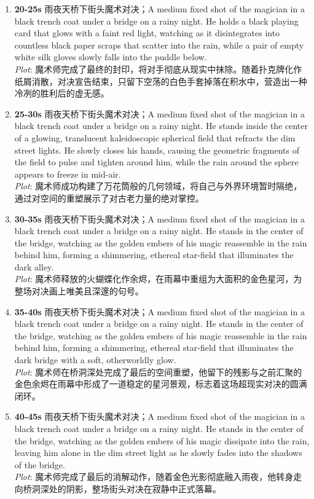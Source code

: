 \documentclass[11pt,a4paper]{article}
\begin{document}
\begin{enumerate}
\item \textbf{20-25s} 雨夜天桥下街头魔术对决；A medium fixed shot of the magician in a black trench coat under a bridge on a rainy night. He holds a black playing card that glows with a faint red light, watching as it disintegrates into countless black paper scraps that scatter into the rain, while a pair of empty white silk gloves slowly falls into the puddle below.\\\newline \textit{Plot}: 魔术师完成了最终的封印，将对手彻底从现实中抹除。随着扑克牌化作纸屑消散，对决宣告结束，只留下空荡的白色手套掉落在积水中，营造出一种冷冽的胜利后的虚无感。
\item \textbf{25-30s} 雨夜天桥下街头魔术对决；A medium fixed shot of the magician in a black trench coat under a bridge on a rainy night. He stands inside the center of a glowing, translucent kaleidoscopic spherical field that refracts the dim street lights. He slowly closes his hands, causing the geometric fragments of the field to pulse and tighten around him, while the rain around the sphere appears to freeze in mid-air.\\\newline \textit{Plot}: 魔术师成功构建了万花筒般的几何领域，将自己与外界环境暂时隔绝，通过对空间的重塑展示了对古老力量的绝对掌控。
\item \textbf{30-35s} 雨夜天桥下街头魔术对决；A medium fixed shot of the magician in a black trench coat under a bridge on a rainy night. He stands in the center of the bridge, watching as the golden embers of his magic reassemble in the rain behind him, forming a shimmering, ethereal star-field that illuminates the dark alley.\\\newline \textit{Plot}: 魔术师释放的火蝴蝶化作余烬，在雨幕中重组为大面积的金色星河，为整场对决画上唯美且深邃的句号。
\item \textbf{35-40s} 雨夜天桥下街头魔术对决；A medium fixed shot of the magician in a black trench coat under a bridge on a rainy night. He stands in the center of the bridge, watching as the golden embers of his magic reassemble in the rain behind him, forming a shimmering, ethereal star-field that illuminates the dark bridge with a soft, otherworldly glow.\\\newline \textit{Plot}: 魔术师在桥洞深处完成了最后的空间重塑，他留下的残影与之前汇聚的金色余烬在雨幕中形成了一道稳定的星河景观，标志着这场超现实对决的圆满闭环。
\item \textbf{40-45s} 雨夜天桥下街头魔术对决；A medium fixed shot of the magician in a black trench coat under a bridge on a rainy night. He stands in the center of the bridge, watching as the golden embers of his magic dissipate into the rain, leaving him alone in the dim street light as he slowly fades into the shadows of the bridge.\\\newline \textit{Plot}: 魔术师完成了最后的消解动作，随着金色光影彻底融入雨夜，他转身走向桥洞深处的阴影，整场街头对决在寂静中正式落幕。

\end{enumerate}
\end{document}
